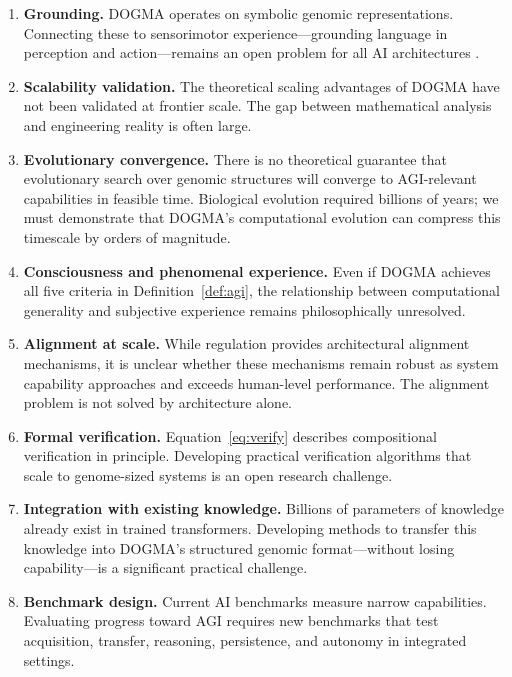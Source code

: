 \begin{enumerate}[leftmargin=1.8em]
  \item \textbf{Grounding.} DOGMA operates on symbolic genomic representations. Connecting these to sensorimotor experience---grounding language in perception and action---remains an open problem for all AI architectures \citep{bisk2020}.

  \item \textbf{Scalability validation.} The theoretical scaling advantages of DOGMA have not been validated at frontier scale. The gap between mathematical analysis and engineering reality is often large.

  \item \textbf{Evolutionary convergence.} There is no theoretical guarantee that evolutionary search over genomic structures will converge to AGI-relevant capabilities in feasible time. Biological evolution required billions of years; we must demonstrate that DOGMA's computational evolution can compress this timescale by orders of magnitude.

  \item \textbf{Consciousness and phenomenal experience.} Even if DOGMA achieves all five criteria in Definition~\ref{def:agi}, the relationship between computational generality and subjective experience remains philosophically unresolved.

  \item \textbf{Alignment at scale.} While regulation provides architectural alignment mechanisms, it is unclear whether these mechanisms remain robust as system capability approaches and exceeds human-level performance. The alignment problem is not solved by architecture alone.

  \item \textbf{Formal verification.} Equation~\ref{eq:verify} describes compositional verification in principle. Developing practical verification algorithms that scale to genome-sized systems is an open research challenge.

  \item \textbf{Integration with existing knowledge.} Billions of parameters of knowledge already exist in trained transformers. Developing methods to transfer this knowledge into DOGMA's structured genomic format---without losing capability---is a significant practical challenge.

  \item \textbf{Benchmark design.} Current AI benchmarks measure narrow capabilities. Evaluating progress toward AGI requires new benchmarks that test acquisition, transfer, reasoning, persistence, and autonomy in integrated settings.
\end{enumerate}

